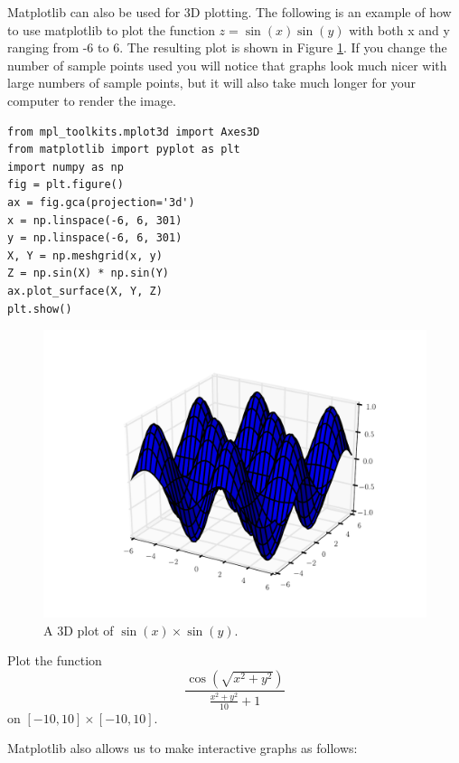 Matplotlib can also be used for 3D plotting.
The following is an example of how to use matplotlib to plot the function $z=\sin(x)\sin(y)$ with both x and y ranging from -6 to 6.
The resulting plot is shown in Figure \ref{mpl:3dplot}.
If you change the number of sample points used you will notice that graphs look much nicer with large numbers of sample points, but it will also take much longer for your computer to render the image.

\begin{lstlisting}
from mpl_toolkits.mplot3d import Axes3D
from matplotlib import pyplot as plt
import numpy as np
fig = plt.figure()
ax = fig.gca(projection='3d')
x = np.linspace(-6, 6, 301)
y = np.linspace(-6, 6, 301)
X, Y = np.meshgrid(x, y)
Z = np.sin(X) * np.sin(Y)
ax.plot_surface(X, Y, Z)
plt.show()
\end{lstlisting}

\begin{figure}
\includegraphics[width=\textwidth]{3dplot.pdf}
\caption{A 3D plot of $\sin\left(x\right)\times\sin\left(y\right)$.}
\label{mpl:3dplot}
\end{figure}

\begin{problem}
Plot the function 
\begin{equation*}
\frac{\cos\left(\sqrt{x^2 + y^2}\right)}{\frac{x^2 + y^2}{10} + 1}
\end{equation*}
on $[-10, 10] \times [-10, 10]$.
\end{problem}

Matplotlib also allows us to make interactive graphs as follows:

